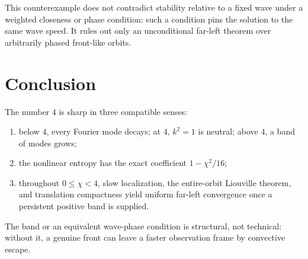 \documentclass[11pt]{article}
\begin{document}
This counterexample does not contradict stability relative to a fixed wave
under a weighted closeness or phase condition: such a condition pins the
solution to the same wave speed.  It rules out only an unconditional
far-left theorem over arbitrarily phased front-like orbits.

\section{Conclusion}

The number \(4\) is sharp in three compatible senses:
\begin{enumerate}[leftmargin=2em]
\item below \(4\), every Fourier mode decays; at \(4\), \(k^2=1\) is
  neutral; above \(4\), a band of modes grows;
\item the nonlinear entropy has the exact coefficient
  \(1-\chi^2/16\);
\item throughout \(0\le\chi<4\), slow localization, the entire-orbit
  Liouville theorem, and translation compactness yield uniform far-left
  convergence once a persistent positive band is supplied.
\end{enumerate}
The band or an equivalent wave-phase condition is structural, not technical:
without it, a genuine front can leave a faster observation frame by
convective escape.
\end{document}
